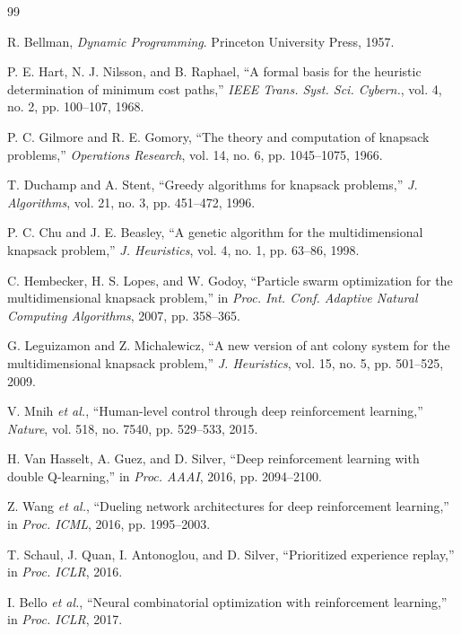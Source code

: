 \documentclass[conference]{IEEEtran}
\begin{document}
\begin{thebibliography}{99}

 R. Bellman, \textit{Dynamic Programming}. Princeton University Press, 1957.

 P. E. Hart, N. J. Nilsson, and B. Raphael, ``A formal basis for the heuristic determination of minimum cost paths,'' \textit{IEEE Trans. Syst. Sci. Cybern.}, vol. 4, no. 2, pp. 100--107, 1968.

 P. C. Gilmore and R. E. Gomory, ``The theory and computation of knapsack problems,'' \textit{Operations Research}, vol. 14, no. 6, pp. 1045--1075, 1966.

 T. Duchamp and A. Stent, ``Greedy algorithms for knapsack problems,'' \textit{J. Algorithms}, vol. 21, no. 3, pp. 451--472, 1996.

 P. C. Chu and J. E. Beasley, ``A genetic algorithm for the multidimensional knapsack problem,'' \textit{J. Heuristics}, vol. 4, no. 1, pp. 63--86, 1998.

 C. Hembecker, H. S. Lopes, and W. Godoy, ``Particle swarm optimization for the multidimensional knapsack problem,'' in \textit{Proc. Int. Conf. Adaptive Natural Computing Algorithms}, 2007, pp. 358--365.

 G. Leguizamon and Z. Michalewicz, ``A new version of ant colony system for the multidimensional knapsack problem,'' \textit{J. Heuristics}, vol. 15, no. 5, pp. 501--525, 2009.

 V. Mnih \textit{et al.}, ``Human-level control through deep reinforcement learning,'' \textit{Nature}, vol. 518, no. 7540, pp. 529--533, 2015.

 H. Van Hasselt, A. Guez, and D. Silver, ``Deep reinforcement learning with double Q-learning,'' in \textit{Proc. AAAI}, 2016, pp. 2094--2100.

 Z. Wang \textit{et al.}, ``Dueling network architectures for deep reinforcement learning,'' in \textit{Proc. ICML}, 2016, pp. 1995--2003.

 T. Schaul, J. Quan, I. Antonoglou, and D. Silver, ``Prioritized experience replay,'' in \textit{Proc. ICLR}, 2016.

 I. Bello \textit{et al.}, ``Neural combinatorial optimization with reinforcement learning,'' in \textit{Proc. ICLR}, 2017.


\end{thebibliography}
\end{document}
